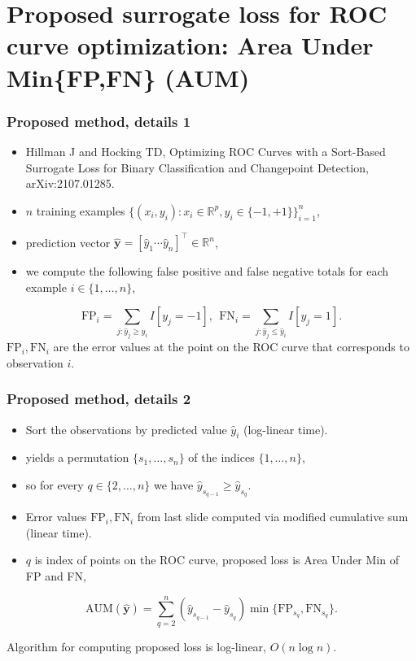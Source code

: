 \documentclass[t]{beamer}
\begin{document}
\section{Proposed surrogate loss for ROC curve optimization: Area Under Min\{FP,FN\} (AUM)} 

\begin{frame}
  \frametitle{Proposed method, details 1}
  \begin{itemize}
  \item Hillman J and Hocking TD, Optimizing ROC Curves with a
    Sort-Based Surrogate Loss for Binary Classification and
    Changepoint Detection, arXiv:2107.01285.
  \item  $n$ training examples $\{(x_i, y_i): x_i \in \mathbb{R}^p, y_i\in \{-1,+1\} \}_{i=1}^n$,
  \item prediction vector $\mathbf{\hat y}=[\hat y_1 \cdots \hat y_n]^\intercal\in\mathbb R^n$,
\item we compute the following false positive and false negative totals for each example $i\in\{1,\dots,n\}$,
  \end{itemize}
\begin{equation}
  \text{FP}_i = \sum_{j: \hat y_j \geq \hat y_i} I[y_j = -1], \ \ 
  \text{FN}_i = \sum_{j: \hat y_j \leq \hat y_i} I[y_j = 1].\label{eq:fp-fn-under}
\end{equation}
$\text{FP}_i, \text{FN}_i$ are the error values at
the point on the ROC curve that corresponds to observation $i$.
\end{frame}

\begin{frame}
  \frametitle{Proposed method, details 2}
  \begin{itemize}
  \item Sort the observations by predicted value $\hat y_i$ (log-linear time).
  \item yields a permutation $\{s_1,\dots, s_n\}$ of the indices $\{1,\dots,n\}$,
  \item so for every $q\in\{2,\dots,n\}$ we have
    $\hat y_{s_{q-1}} \geq \hat y_{s_q}$.
  \item Error values $\text{FP}_i,\text{FN}_i$ from last slide
    computed via modified cumulative sum (linear time).
  \item $q$ is index of points on the ROC curve, proposed loss is Area
    Under Min of FP and FN,
  \end{itemize}
\begin{equation}
    \text{AUM}(\mathbf{\hat y}) =
    \sum_{q=2}^n 
    (\hat y_{s_{q-1}} -\hat y_{s_q}) 
    \min\{
    \text{FP}_{s_q}, 
    \text{FN}_{s_q}\label{eq:min_below}
    \}. 
  \end{equation}

  Algorithm for computing proposed loss is log-linear, $O(n\log n)$.


\end{frame}
 
\end{document}
